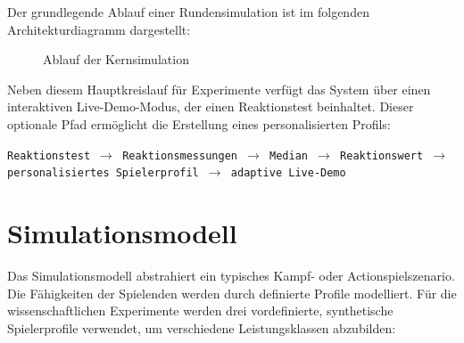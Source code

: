 \documentclass[11pt,a4paper]{article}
\begin{document}
Der grundlegende Ablauf einer Rundensimulation ist im folgenden Architekturdiagramm dargestellt:

\begin{figure}[H]
    \centering
    \caption{Ablauf der Kernsimulation}
\end{figure}

Neben diesem Hauptkreislauf für Experimente verfügt das System über einen interaktiven Live-Demo-Modus, der einen Reaktionstest beinhaltet. Dieser optionale Pfad ermöglicht die Erstellung eines personalisierten Profils:
\begin{center}
\small \texttt{Reaktionstest $\rightarrow$ Reaktionsmessungen $\rightarrow$ Median $\rightarrow$ Reaktionswert $\rightarrow$ personalisiertes Spielerprofil $\rightarrow$ adaptive Live-Demo}
\end{center}

\section{Simulationsmodell}

Das Simulationsmodell abstrahiert ein typisches Kampf- oder Actionspielszenario. Die Fähigkeiten der Spielenden werden durch definierte Profile modelliert. Für die wissenschaftlichen Experimente werden drei vordefinierte, synthetische Spielerprofile verwendet, um verschiedene Leistungsklassen abzubilden:
\end{document}
